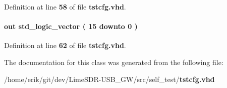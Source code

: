 Definition at line {\bf 58} of file {\bf tstcfg.\+vhd}.

\paragraph[{T\+X\+\_\+\+T\+S\+T\+\_\+Q}]{ {\bfseries \textcolor{keywordflow}{out}\textcolor{vhdlchar}{ }} {\bfseries \textcolor{comment}{std\+\_\+logic\+\_\+vector}\textcolor{vhdlchar}{ }\textcolor{vhdlchar}{(}\textcolor{vhdlchar}{ }\textcolor{vhdlchar}{ } \textcolor{vhdldigit}{15} \textcolor{vhdlchar}{ }\textcolor{keywordflow}{downto}\textcolor{vhdlchar}{ }\textcolor{vhdlchar}{ } \textcolor{vhdldigit}{0} \textcolor{vhdlchar}{ }\textcolor{vhdlchar}{)}\textcolor{vhdlchar}{ }} \hspace{0.3cm}{\ttfamily [Port]}}\label{clasststcfg_a1b9fd3f7d6b23eb6bd4b4f7ebad29ba4}


Definition at line {\bf 62} of file {\bf tstcfg.\+vhd}.



The documentation for this class was generated from the following file\+:\begin{DoxyCompactItemize}
\item 
/home/erik/git/dev/\+Lime\+S\+D\+R-\/\+U\+S\+B\+\_\+\+G\+W/src/self\+\_\+test/{\bf tstcfg.\+vhd}\end{DoxyCompactItemize}
